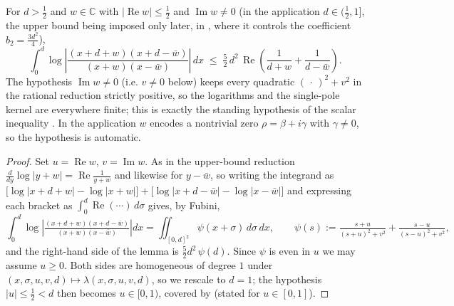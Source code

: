 \begin{lemma}
\label{lem:lb_booker}
\leanok
{}
For $d>\tfrac12$ and $w\in\mathbb{C}$ with $|\operatorname{Re}w|\le\tfrac12$ and
$\operatorname{Im}w\neq0$ (in the application $d\in(\tfrac12,1]$, the upper bound being imposed
only later, in , where it controls the coefficient $b_2=\tfrac{3d^2}4$),
\[
  \int_{0}^{d}
  \log\left|\frac{(x+d+w)(x+d-\bar w)}{(x+w)(x-\bar w)}\right|\,dx
  \;\le\; \tfrac52\,d^2\,
  \operatorname{Re}\!\left(\frac{1}{d+w}+\frac{1}{d-\bar w}\right).
\]
The hypothesis $\operatorname{Im}w\neq0$ (i.e. $v\neq0$ below) keeps every quadratic
$(\,\cdot\,)^2+v^2$ in the rational reduction strictly positive, so the logarithms and the
single-pole kernel are everywhere finite; this is exactly the standing hypothesis of the
scalar inequality . In the application $w$ encodes a nontrivial
zero $\rho=\beta+i\gamma$ with $\gamma\neq0$, so the hypothesis is automatic.
\end{lemma}

\begin{proof}
\leanok
{}
Set $u=\operatorname{Re}w$, $v=\operatorname{Im}w$. As in the upper-bound reduction
$\tfrac{d}{dy}\log|y+w|=\operatorname{Re}\tfrac1{y+w}$ and likewise for $y-\bar w$,
so writing the integrand as
$\bigl[\log|x{+}d{+}w|-\log|x{+}w|\bigr]+\bigl[\log|x{+}d{-}\bar w|-\log|x{-}\bar w|\bigr]$
and expressing each bracket as $\int_0^d\operatorname{Re}(\cdots)\,d\sigma$ gives,
by Fubini,
\[
  \int_0^d\log\left|\tfrac{(x+d+w)(x+d-\bar w)}{(x+w)(x-\bar w)}\right|dx
  =\iint_{[0,d]^2}\psi(x+\sigma)\,d\sigma\,dx,
  \qquad
  \psi(s):=\tfrac{s+u}{(s+u)^2+v^2}+\tfrac{s-u}{(s-u)^2+v^2},
\]
and the right-hand side of the lemma is $\tfrac52 d^2\,\psi(d)$. Since $\psi$ is
even in $u$ we may assume $u\ge0$. Both sides are homogeneous of degree $1$ under
$(x,\sigma,u,v,d)\mapsto\lambda(x,\sigma,u,v,d)$, so we rescale to $d=1$; the
hypothesis $|u|\le\tfrac12<d$ then becomes $u\in[0,1)$, covered by
 (stated for $u\in[0,1]$).
\end{proof}


